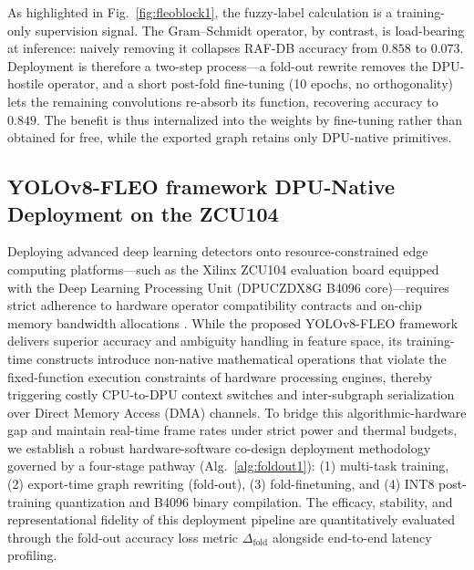 \documentclass[algorithms,article,submit,moreauthors]{Definitions/mdpi}
\newcommand{\rev}[1]{\textcolor{revcolor}{#1}}
\begin{document}
As highlighted in Fig.~\ref{fig:fleoblock1}, the fuzzy-label calculation is a training-only supervision signal. \rev{The Gram--Schmidt operator, by contrast, is load-bearing at inference: naively removing it collapses RAF-DB accuracy from \mbox{$0.858$} to \mbox{$0.073$}. Deployment is therefore a two-step process---a fold-out rewrite removes the DPU-hostile operator, and a short post-fold fine-tuning (10 epochs, no orthogonality) lets the remaining convolutions re-absorb its function, recovering accuracy to \mbox{$0.849$}. The benefit is thus internalized into the weights by fine-tuning rather than obtained for free, while the exported graph retains only DPU-native primitives.}
\subsection{YOLOv8-FLEO framework DPU-Native Deployment on the ZCU104}
\label{sec:hard}
Deploying advanced deep learning detectors onto resource-constrained edge computing platforms---such as the Xilinx ZCU104 evaluation board equipped with the Deep Learning Processing Unit (DPUCZDX8G B4096 core)---requires strict adherence to hardware operator compatibility contracts and on-chip memory bandwidth allocations \citep{bib25}. While the proposed YOLOv8-FLEO framework delivers superior accuracy and ambiguity handling in feature space, its training-time constructs introduce non-native mathematical operations that violate the fixed-function execution constraints of hardware processing engines, thereby triggering costly CPU-to-DPU context switches and inter-subgraph serialization over Direct Memory Access (DMA) channels. To bridge this algorithmic-hardware gap and maintain real-time frame rates under strict power and thermal budgets, we establish a robust hardware-software co-design deployment methodology governed by a four-stage pathway (Alg.~\ref{alg:foldout1}): (1) multi-task training, (2) export-time graph rewriting (fold-out), (3) fold-finetuning, and (4) INT8 post-training quantization and B4096 binary compilation. The efficacy, stability, and representational fidelity of this deployment pipeline are quantitatively evaluated through the fold-out accuracy loss metric $\Delta_{\mathrm{fold}}$ alongside end-to-end latency profiling.
\end{document}
